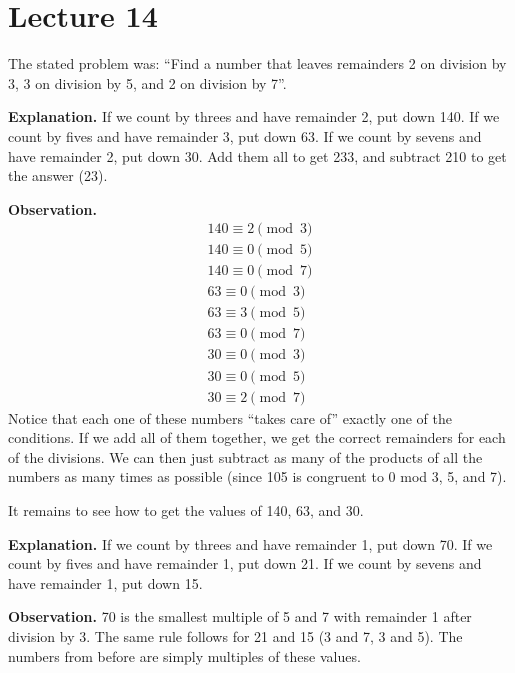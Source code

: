 \documentclass[class=article, crop=false]{standalone}
\begin{document}
  \section{Lecture 14}
  The stated problem was: ``Find a number that leaves remainders 2 on division by 3, 3 on division by 5, and 2 on division by 7''. \par
  \textbf{Explanation.}
  If we count by threes and have remainder 2, put down 140. If we count by fives and have remainder 3, put down 63. If we count by sevens and have remainder 2, put down 30. Add them all to get 233, and subtract 210 to get the answer (23). \par
  \textbf{Observation.}
  \begin{align*}
    140\equiv 2 \pmod 3 \\
    140\equiv 0 \pmod 5 \\
    140\equiv 0 \pmod 7 \\
    63\equiv 0 \pmod 3 \\
    63\equiv 3 \pmod 5 \\
    63\equiv 0 \pmod 7 \\
    30\equiv 0 \pmod 3 \\
    30\equiv 0 \pmod 5 \\
    30\equiv 2 \pmod 7
  \end{align*}
  Notice that each one of these numbers ``takes care of'' exactly one of the conditions. If we add all of them together, we get the correct remainders for each of the divisions. We can then just subtract as many of the products of all the numbers as many times as possible (since 105 is congruent to 0 mod 3, 5, and 7). \par
  It remains to see how to get the values of 140, 63, and 30. \par
  \textbf{Explanation.} If we count by threes and have remainder 1, put down 70. If we count by fives and have remainder 1, put down 21. If we count by sevens and have remainder 1, put down 15. \par
  \textbf{Observation.} 70 is the smallest multiple of 5 and 7 with remainder 1 after division by 3. The same rule follows for 21 and 15 (3 and 7, 3 and 5). The numbers from before are simply multiples of these values.
\end{document}
